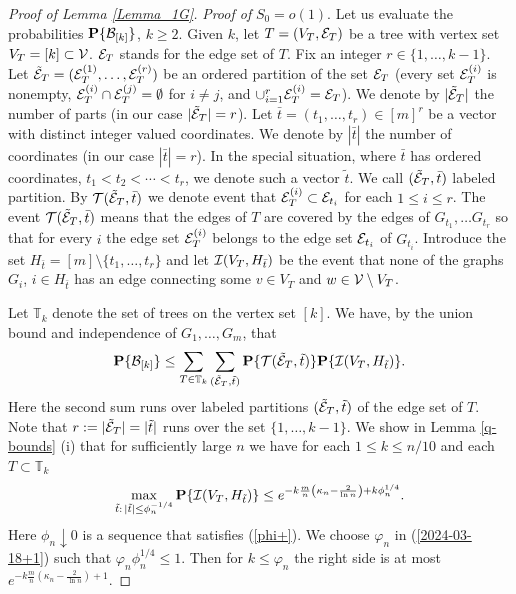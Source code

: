 \documentclass[11pt, a4paper]{article}
\newcommand{\PP}{{\bf{P}}}
\begin{document}
\begin{proof}[Proof of Lemma \ref{Lemma_1G}]
{\it Proof of} $S_0=o(1)$.
Let us evaluate the probabilities 
$\PP\{{\cal B}_{[k]}\}$, $k\ge 2$.
Given $k$, let $T=(V_T,{\cal E}_T)$ be a tree with vertex set 
$V_T=[k]\subset {\cal V}$.  ${\cal E}_T$ stands for the edge set of $T$.
 Fix an integer $r\in\{1,\dots, k-1\}$.
Let 
${\tilde {\cal E}}_T=({\cal E}_T^{(1)},\dots, {\cal E}_T^{(r)})$ be an ordered partition of the set ${\cal E}_T$ 
(every set ${\cal E}_T^{(i)}$ is nonempty, 
${\cal E}_T^{(i)}\cap{\cal E}_T^{(j)}=\emptyset$ 
for $i\not=j$, 
and $\cup_{i=1}^r{\cal E}_T^{(i)}={\cal E}_T$).
We denote by 
$|{\tilde {\cal E}}_T|$ the number of parts (in our case $|{\tilde {\cal E}}_T|=r$).
Let ${\bar t}=(t_1,\dots, t_r)\in [m]^r$ be a 
vector with distinct integer valued coordinates.
We denote by $|{\bar t}|$ the number of coordinates (in our case $|{\bar t}|=r$).
In the special situation, where  $\bar t$ has ordered coordinates,
$t_1<t_2<\cdots<t_r$, we denote such a vector 
${\tilde t}$.
%
We call 
$({\tilde {\cal E}}_T, {\bar t})$ labeled partition.
By
${\cal T}({\tilde {\cal E}}_T, {\bar t})$  we denote event 
 that ${\cal E}_T^{(i)}\subset {\cal E}_{t_i}$ 
 for each $1\le i\le r$. The 
 event ${\cal T}({\tilde {\cal E}}_T, {\bar t})$ means that the  edges of
$T$ are covered by  the edges of $G_{t_1},\dots G_{t_r}$ so 
that
for every $i$ the edge set ${\cal E}_T^{(i)}$ belongs to the edge set ${\cal E}_{t_i}$ of $G_{t_i}$.
Introduce the set  $H_{\bar t}=[m]\setminus\{t_1,\dots, t_r\}$  and let 
${\cal I}(V_T, H_{\bar t})$ be the event that 
none of the graphs $G_{i}$, $i\in H_{\bar t}$ has an edge connecting some 
$v\in V_T$ and $w\in {\cal V}\setminus V_T$. 

 
 
 
 
 
 


\medskip

Let ${\mathbb T}_k$ denote the set of trees on the vertex set $[k]$.
We have, by the union bound and independence 
of $G_{1},\dots, G_{m}$, that
\begin{equation}
\label{suma}
\PP\{{\cal B}_{[k]}\}
\le
\sum_{T\in {\mathbb T}_k}
\sum_{({\tilde {\cal E}}_T,{\tilde t})}
\PP\{{\cal T}({\tilde {\cal E}}_T, {\tilde t})\}
\PP\{{\cal I}(V_T, H_{\tilde t})\}.
\end{equation}
Here the second sum runs over labeled partitions 
$({\tilde {\cal E}}_T, {\tilde t})$
of the edge set of $T$. Note that 
$r:=|{\tilde {\cal E}}_T|=|{\tilde t}|$ runs over the set $\{1,\dots, k-1\}$.
We show in Lemma \ref{q-bounds} (i) that  for  sufficiently large $n$ we have 
for each $1\le k\le n/10$ and each $T\subset {\mathbb T}_k$ 
\begin{align*}
\max_{{\tilde t}:\,|{\tilde t}|\le \phi_n^{-1/4}}
\PP\{{\cal I}(V_T, H_{\tilde t})\}
\le 
e^{
-
k\frac{m}{n}
\left(\kappa_n-\frac{2}{\ln n}\right)
+
k\phi_n^{1/4}
}.
\end{align*}
Here $\phi_n\downarrow 0$ is a sequence that satisfies (\ref{phi+}).
We choose  $\varphi_n$ in (\ref{2024-03-18+1}) such that 
$\varphi_n\phi_n^{1/4}\le 1$. Then for $k\le \varphi_n$ the
right side is at most $e^{
-
k\frac{m}{n}
\left(\kappa_n-\frac{2}{\ln n}\right)
+
1
}$.


\end{proof}
\end{document}
